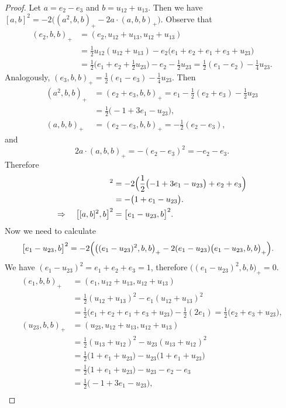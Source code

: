 \documentclass{article}
\begin{document}
\begin{proof}
Let $a=e_2-e_3$ and $b=u_{12}+u_{13}$. Then we have $[a,b]^2=-2\bigl((a^2,b,b)_+ - 2a\cdot(a,b,b)_+\bigr)$. Observe that
\begin{align*}
(e_2,b,b)_+ &= (e_2,u_{12}+u_{13},u_{12}+u_{13}) \\
&= \frac{1}{2}u_{12}(u_{12}+u_{13}) - e_2\bigl(e_1+e_2+e_1+e_3+u_{23}\bigr) \\
&= \frac{1}{2}\bigl(e_1+e_2+\frac{1}{2}u_{23}\bigr)-e_2-\frac{1}{2}u_{23} = \frac{1}{2}(e_1-e_2)-\frac{1}{4}u_{23}.
\end{align*}
Analogously, $(e_3,b,b)_+=\frac{1}{2}(e_1-e_3)-\frac{1}{4}u_{23}$.
Then
\begin{align*}
(a^2,b,b)_+ &= (e_2+e_3,b,b)_+ = e_1-\frac{1}{2}(e_2+e_3)-\frac{1}{2}u_{23} \\
&= \frac{1}{2}\bigl(-1+3e_1-u_{23}\bigr), \\
(a,b,b)_+ &= (e_2-e_3,b,b)_+ = -\frac{1}{2}(e_2-e_3),
\end{align*}
and
\[
2a\cdot(a,b,b)_+ = -(e_2-e_3)^2 = -e_2-e_3.
\]
Therefore
\begin{align*}
[a,b]^2 &= -2\Bigl(\frac{1}{2}\bigl(-1+3e_1-u_{23}\bigr)+e_2+e_3\Bigr) \\
&= -\bigl(1+e_1-u_{23}\bigr). \\
\Rightarrow\quad \bigl[[a,b]^2,b\bigr]^2 &= \bigl[e_1-u_{23},b\bigr]^2.
\end{align*}
Now we need to calculate
\begin{align*}
\bigl[e_1-u_{23},b\bigr]^2 &= -2\Bigl(\bigl((e_1-u_{23})^2,b,b\bigr)_+ - 2(e_1-u_{23})\bigl(e_1-u_{23},b,b\bigr)_+\Bigr).
\end{align*}
We have $(e_1-u_{23})^2=e_1+e_2+e_3=1$, therefore $\bigl((e_1-u_{23})^2,b,b\bigr)_+=0$.
\begin{align*}
(e_1,b,b)_+ &= (e_1,u_{12}+u_{13},u_{12}+u_{13}) \\
&= \frac{1}{2}(u_{12}+u_{13})^2 - e_1(u_{12}+u_{13})^2 \\
&= \frac{1}{2}\bigl(e_1+e_2+e_1+e_3+u_{23}\bigr) - \frac{1}{2}(2e_1) = \frac{1}{2}\bigl(e_2+e_3+u_{23}\bigr), \\
(u_{23},b,b)_+ &= (u_{23},u_{12}+u_{13},u_{12}+u_{13}) \\
&= \frac{1}{2}(u_{13}+u_{12})^2 - u_{23}(u_{13}+u_{12})^2 \\
&= \frac{1}{2}\bigl(1+e_1+u_{23}\bigr) - u_{23}\bigl(1+e_1+u_{23}\bigr) \\
&= \frac{1}{2}\bigl(1+e_1+u_{23}\bigr) - u_{23} - e_2 - e_3 \\
&= \frac{1}{2}\bigl(-1+3e_1-u_{23}\bigr), \\

\end{align*}
\end{proof}
\end{document}
